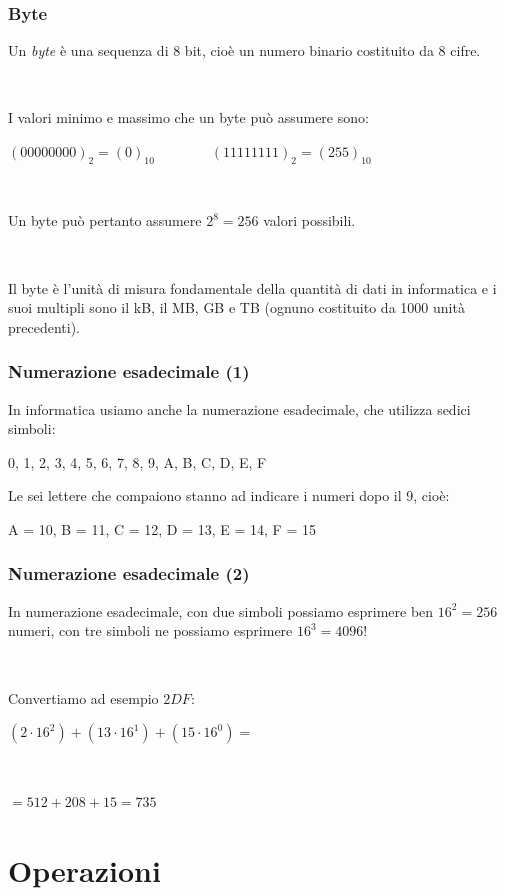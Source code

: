 \documentclass[handout]{beamer}
\begin{document}
\begin{frame}
\frametitle{Byte}
Un \emph{byte} è una sequenza di \alert<1>{8 bit}, cioè un numero binario costituito da 8 cifre.\pause

~

I valori minimo e massimo che un byte può assumere sono:
\begin{center}
  $ (00000000)_2 = (0)_{10} \qquad\qquad (11111111)_2 = (255)_{10} $
\end{center}\pause

~

Un byte può pertanto assumere $ 2^8 = 256 $ valori possibili.\pause

~

Il byte è l'unità di misura fondamentale della quantità di dati in informatica e i suoi multipli sono il kB, il MB, GB e TB (ognuno costituito da 1000 unità precedenti).
\end{frame}



\begin{frame}
\frametitle{Numerazione esadecimale (1)}
In informatica usiamo anche la numerazione esadecimale, che utilizza \alert<1>{sedici simboli}:
\begin{center}
  0, 1, 2, 3, 4, 5, 6, 7, 8, 9, A, B, C, D, E, F
\end{center}\pause
Le sei lettere che compaiono stanno ad indicare i numeri dopo il 9, cioè:
\begin{center}
  A = 10, B = 11, C = 12, D = 13, E = 14, F = 15
\end{center}
\end{frame}


\begin{frame}
\frametitle{Numerazione esadecimale (2)}
In numerazione esadecimale, con due simboli possiamo esprimere ben $ 16^2 = 256 $ numeri, con tre simboli ne possiamo esprimere $ 16^3 = 4096 $!\pause

~

Convertiamo ad esempio $ 2DF $:\pause
\begin{center}
  $ (2 \cdot 16^2) + (13 \cdot 16^1) + (15 \cdot 16^0) = $\pause

  ~

  $ = 512 + 208 + 15 = 735 $
\end{center}
\end{frame}

\section{Operazioni}
\end{document}
